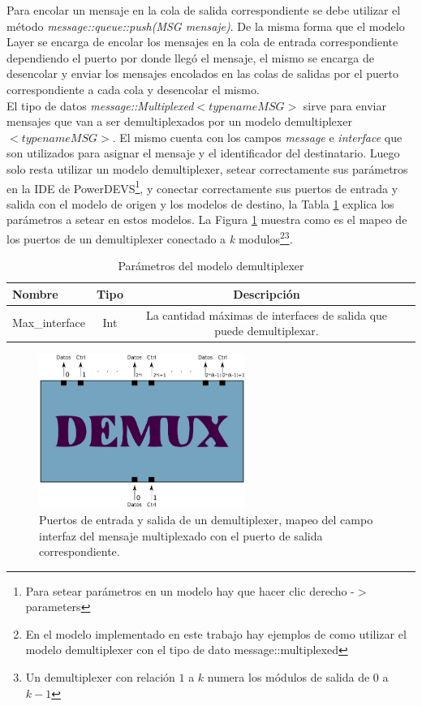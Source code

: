 \documentclass[10pt,a4paper]{article}
\begin{document}
Para encolar un mensaje en la cola de salida correspondiente se debe utilizar el método \textit{message::queue::push(MSG mensaje)}. De la misma forma que el modelo Layer se encarga de encolar los mensajes en la cola de entrada correspondiente dependiendo el puerto por donde llegó el mensaje, el mismo se encarga de desencolar y enviar los mensajes encolados en las colas de salidas por el puerto correspondiente a cada cola y desencolar el mismo. \\

El tipo de datos \textit{message::Multiplexed}$<typename MSG>$ sirve para enviar mensajes que van a ser demultiplexados por un modelo demultiplexer$<typename MSG>$. El mismo cuenta con los campos \textit{message} e \textit{interface} que son utilizados para asignar el mensaje y el identificador del destinatario. Luego solo resta utilizar un modelo demultiplexer, setear correctamente sus parámetros en la IDE de PowerDEVS\footnote{Para setear parámetros en un modelo hay que hacer clic derecho -$>$ parameters}, y conectar correctamente sus puertos de entrada y salida con el modelo de origen y los modelos de destino, la Tabla \ref{table: parameter demultiplexer} explica los parámetros a setear en estos modelos. La Figura \ref{figure: demultiplexer} muestra como es el mapeo de los puertos de un demultiplexer conectado a \textit{k} modulos\footnote{En el modelo implementado en este trabajo hay ejemplos de como utilizar el modelo demultiplexer con el tipo de dato message::multiplexed}\footnote{Un demultiplexer con relación $1$ a $k$ numera los módulos de salida de $0$ a $k-1$}. \\

\begin{table}[h]
	\begin{tabular}{|l|c|c|c|}
  		\hline
  		\textbf{Nombre} & \textbf{Tipo} & \textbf{Descripción} \\
  		\hline
  		Max\_interface & Int & La cantidad máximas de interfaces de salida que puede demultiplexar. \\
  		\hline
	\end{tabular}
	\caption{Parámetros del modelo demultiplexer}
	\label{table: parameter demultiplexer}
\end{table}

\begin{figure}[htbp]
    \centering
    \includegraphics[width = 0.6\textwidth]{img/png/demultiplexer.png}
    \caption{Puertos de entrada y salida de un demultiplexer, mapeo del campo interfaz del mensaje multiplexado con el puerto de salida correspondiente.}
    \label{figure: demultiplexer}
\end{figure}
\end{document}
